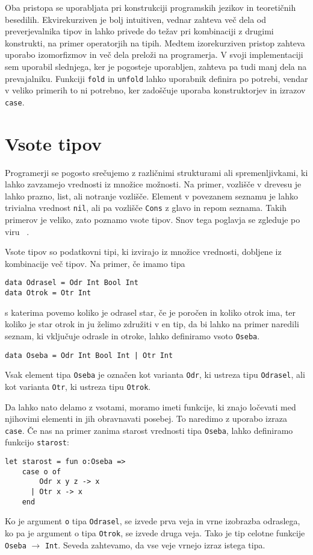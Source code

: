 \documentclass[12pt,a4paper,openany]{book}
\begin{document}
Oba pristopa se uporabljata pri konstrukciji programskih jezikov in teoretičnih besedilih. Ekvirekurziven je bolj intuitiven, vednar zahteva več dela od preverjevalnika tipov in 
lahko privede do težav pri kombinaciji z drugimi konstrukti, na primer operatorjih na tipih. Medtem izorekurziven pristop zahteva uporabo izomorfizmov in več dela preloži na programerja. 
V svoji implementaciji sem uporabil slednjega, ker je pogosteje uporabljen, zahteva pa tudi manj dela na prevajalniku. Funkciji \lstinline{fold} in \lstinline{unfold} lahko uporabnik definira po potrebi, 
vendar v veliko primerih to ni potrebno, ker zadoščuje uporaba konstruktorjev in izrazov \lstinline{case}.

\chapter{Vsote tipov}
Programerji se pogosto srečujemo z različnimi strukturami ali spremenljivkami, ki lahko zavzamejo vrednosti iz množice možnosti. Na primer, vozlišče v drevesu je lahko prazno, list, ali 
notranje vozlišče. Element v povezanem seznamu je lahko trivialna vrednost \lstinline{nil}, ali pa vozlišče \lstinline{Cons} z glavo in repom seznama. Takih primerov je veliko, zato poznamo vsote tipov. 
Snov tega poglavja se zgleduje po viru ~\cite{Pie02}.

Vsote tipov so podatkovni tipi, ki izvirajo iz množice vrednosti, dobljene iz kombinacije več tipov. Na primer, če imamo tipa
\begin{lstlisting}
data Odrasel = Odr Int Bool Int
data Otrok = Otr Int
\end{lstlisting}
s katerima povemo koliko je odrasel star, če je poročen in koliko otrok ima, ter koliko je star otrok in ju želimo združiti v en tip, da bi lahko na primer naredili seznam, ki vključuje odrasle in otroke, lahko definiramo vsoto \lstinline{Oseba}.
\begin{lstlisting}
data Oseba = Odr Int Bool Int | Otr Int
\end{lstlisting}
Vsak element tipa \lstinline{Oseba} je označen kot varianta \lstinline{Odr}, ki ustreza tipu \lstinline{Odrasel}, ali kot varianta \lstinline{Otr}, ki ustreza tipu \lstinline{Otrok}.

Da lahko nato delamo z vsotami, moramo imeti funkcije, ki znajo ločevati med njihovimi elementi in jih obravnavati posebej. To naredimo z uporabo izraza \lstinline{case}. Če nas na primer zanima 
starost vrednosti tipa \lstinline{Oseba}, lahko definiramo funkcijo \lstinline{starost}:
\begin{lstlisting}
let starost = fun o:Oseba =>
    case o of
        Odr x y z -> x
      | Otr x -> x
    end
\end{lstlisting}
Ko je argument \lstinline{o} tipa \lstinline{Odrasel}, se izvede prva veja in vrne izobrazba odraslega, ko pa je argument o tipa \lstinline{Otrok}, se izvede druga veja. Tako je tip celotne funkcije 
\lstinline{Oseba} $\rightarrow$ \lstinline{Int}. Seveda zahtevamo, da vse veje vrnejo izraz istega tipa.
\end{document}
